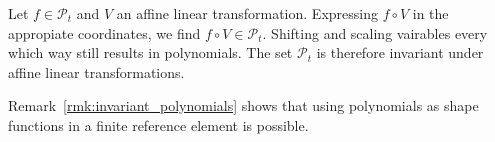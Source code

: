 \begin{remark}{\quad\label{rmk:invariant_polynomials}}
   Let $f\in\mathcal{P}_t$ and $V$ an affine linear transformation. 
   Expressing $f\circ V$ in the appropiate coordinates, we find 
   $f\circ V\in\mathcal{P}_t$. Shifting and scaling vairables every which way 
   still results in polynomials. The set $\mathcal{P}_t$ is 
   therefore invariant under affine linear transformations.
\end{remark}
Remark~\ref{rmk:invariant_polynomials} shows that using polynomials 
as shape functions in a finite reference element is possible.